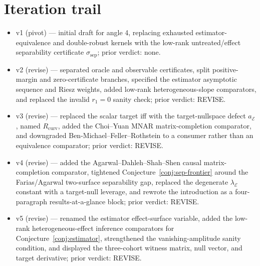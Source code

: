 \documentclass[11pt]{article}
\theoremstyle{definition}
\theoremstyle{plain}
\theoremstyle{remark}
\begin{document}
\section{Iteration trail}
\begin{itemize}[leftmargin=*]
\item v1 (pivot) --- initial draft for angle 4, replacing exhausted estimator-equivalence and double-robust kernels with the low-rank untreated/effect separability certificate \(\sigma_{\mathrm{sep}}\); prior verdict: none.
\item v2 (revise) --- separated oracle and observable certificates, split positive-margin and zero-certificate branches, specified the estimator asymptotic sequence and Riesz weights, added low-rank heterogeneous-slope comparators, and replaced the invalid \(r_1=0\) sanity check; prior verdict: REVISE.
\item v3 (revise) --- replaced the scalar target iff with the target-nullspace defect \(a_{\mathcal E}\), named \(R_{\mathrm{curv}}\), added the Choi--Yuan MNAR matrix-completion comparator, and downgraded Ben-Michael--Feller--Rothstein to a consumer rather than an equivalence comparator; prior verdict: REVISE.
\item v4 (revise) --- added the Agarwal--Dahleh--Shah--Shen causal matrix-completion comparator, tightened Conjecture~\ref{conj:sep-frontier} around the Farias/Agarwal two-surface separability gap, replaced the degenerate \(\lambda_{\mathcal E}\) constant with a target-null leverage, and rewrote the introduction as a four-paragraph results-at-a-glance block; prior verdict: REVISE.
\item v5 (revise) --- renamed the estimator effect-surface variable, added the low-rank heterogeneous-effect inference comparators for Conjecture~\ref{conj:estimator}, strengthened the vanishing-amplitude sanity condition, and displayed the three-cohort witness matrix, null vector, and target derivative; prior verdict: REVISE.
\end{itemize}
\end{document}
